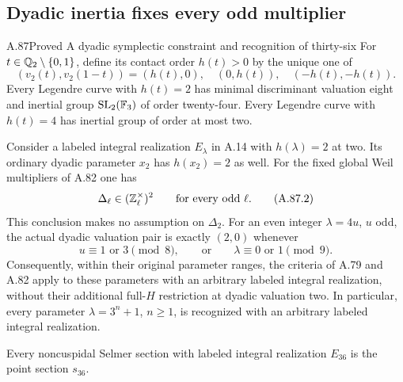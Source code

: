 \subsection{Dyadic inertia fixes every odd multiplier}

\begin{statement}{A.87}{Proved}
{A dyadic symplectic constraint and recognition of thirty-six}
For $t\in\mathbb Q_2\setminus\{0,1\}$, define its contact order $h(t)>0$
by the unique one of
\[
 (v_2(t),v_2(1-t))=(h(t),0),\quad(0,h(t)),
                         \quad(-h(t),-h(t)).
\tag{A.87.1}
\]
Every Legendre curve with $h(t)=2$ has minimal discriminant
valuation eight and inertial group $\mathrm{SL}_2(\mathbb F_3)$ of
order twenty-four.  Every Legendre curve with $h(t)=4$
has inertial group of order at most two.

Consider a labeled integral realization $E_{\lambda}$ in A.14
with $h(\lambda)=2$ at two.  Its ordinary dyadic parameter
$x_2$ has $h(x_2)=2$ as well.  For the fixed global
Weil multipliers of A.82 one has
\[
                    \Delta_\ell\in(\mathbb Z_\ell^\times)^2
                              \qquad\text{for every odd }\ell.
\tag{A.87.2}
\]
This conclusion makes no assumption on $\Delta_2$.
For an even integer $\lambda=4u$, $u$ odd, the actual
dyadic valuation pair is exactly $(2,0)$ whenever
\[
 u\equiv1\text{ or }3\pmod8,
             \qquad\text{or}\qquad
 \lambda\equiv0\text{ or }1\pmod9.
\tag{A.87.2a}
\]
Consequently, within their original parameter ranges, the criteria of A.79 and
A.82 apply to these parameters with an arbitrary labeled
integral realization, without their additional full-$H$
restriction at dyadic valuation two.
In particular, every parameter $\lambda=3^n+1$, $n\ge1$,
is recognized with an arbitrary labeled integral realization.

Every noncuspidal Selmer section with labeled integral
realization $E_{36}$ is the point section $s_{36}$.
\end{statement}
